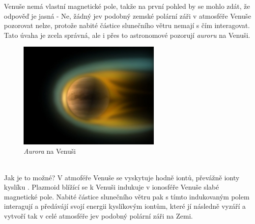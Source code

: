 \documentclass{../../../../style/mkimain}
\begin{document}
\noindent{}
\proborigin{}
\klein
Venuše nemá vlastní magnetické pole, takže na první pohled by se mohlo zdát, že odpověď je jasná - Ne, žádný jev podobný zemské polární záři v 
atmosféře Venuše pozorovat nelze, protože nabité částice slunečního větru nemají s čím interagovat. Tato úvaha je zcela správná, ale i přes to astronomové pozorují \emph{auroru} na Venuši.
\begin{figure}[htpb]
    \begin{center}
    \includegraphics[width=7cm]{images/venus-aurora.jpg}
    \\
    \emph{Aurora} na Venuši\footnotemark
    \end{center}
\end{figure}
\\ Jak je to možné? V atmoféře Venuše se vyskytuje hodně iontů, převážně ionty kyslíku . Plazmoid blížící se k Venuši indukuje v 
ionosféře Venuše slabé magnetické pole. Nabité částice slunečního větru pak s tímto indukovaným polem interagují a předávájí svojí energii 
kyslíkovým iontům, které jí následně vyzáří a vytvoří tak v celé atmosféře jev podobný polární záři na Zemi. 
\end{document}
